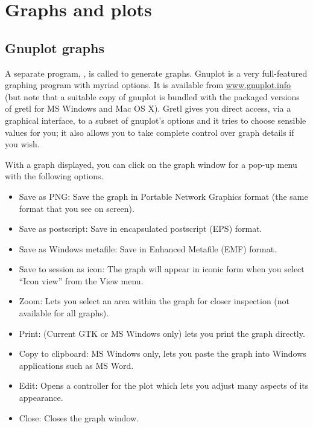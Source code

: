 \chapter{Graphs and plots}
\label{chap:graphs}

\section{Gnuplot graphs}
\label{gnuplot-graphs}

A separate program, , is called to generate graphs.
Gnuplot is a very full-featured graphing program with myriad options.
It is available from \href{http://www.gnuplot.info/}{www.gnuplot.info}
(but note that a suitable copy of gnuplot is bundled with the packaged
versions of gretl for MS Windows and Mac OS X).  Gretl gives you
direct access, via a graphical interface, to a subset of gnuplot's
options and it tries to choose sensible values for you; it also allows
you to take complete control over graph details if you wish.

With a graph displayed, you can click on the graph window for a pop-up
menu with the following options.

\begin{itemize}
\item \textsf{Save as PNG}: Save the graph in Portable Network
  Graphics format (the same format that you see on screen).
\item \textsf{Save as postscript}: Save in encapsulated postscript
  (EPS) format.
\item \textsf{Save as Windows metafile}: Save in Enhanced Metafile
  (EMF) format.
\item \textsf{Save to session as icon}: The graph will appear in
  iconic form when you select ``Icon view'' from the View menu.
\item \textsf{Zoom}: Lets you select an area within the graph for
  closer inspection (not available for all graphs).
\item \textsf{Print}: (Current GTK or MS Windows only) lets you
  print the graph directly.
\item \textsf{Copy to clipboard}: MS Windows only, lets you paste the
  graph into Windows applications such as MS Word.
\item \textsf{Edit}: Opens a controller for the plot which lets you
  adjust many aspects of its appearance.
\item \textsf{Close}: Closes the graph window.
\end{itemize}


